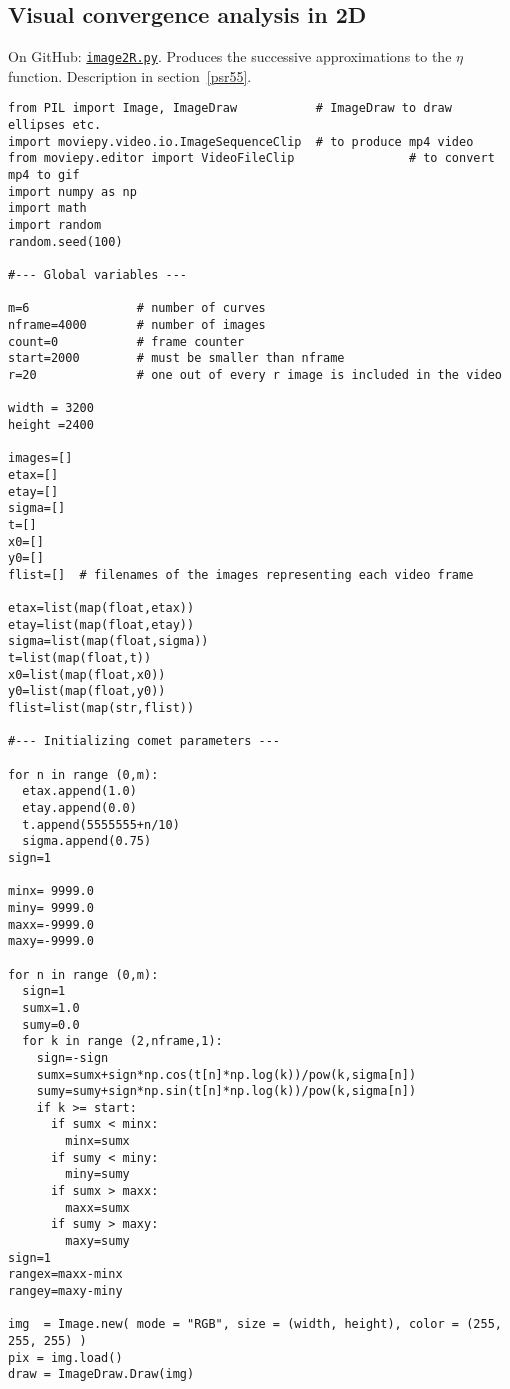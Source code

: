 \documentclass[oneside,10pt]{book}
\begin{document}
\subsection{Visual convergence analysis in 2D}\label{conv222}

On GitHub: \href{https://github.com/VincentGranville/Visualizations/blob/main/Source-Code/image2R.py}{\texttt{image2R.py}}. Produces the successive approximations to the $\eta$ function. Description in section~\ref{psr55}.

\begin{lstlisting}
from PIL import Image, ImageDraw           # ImageDraw to draw ellipses etc.
import moviepy.video.io.ImageSequenceClip  # to produce mp4 video
from moviepy.editor import VideoFileClip                # to convert mp4 to gif
import numpy as np
import math
import random
random.seed(100)

#--- Global variables ---

m=6               # number of curves
nframe=4000       # number of images
count=0           # frame counter
start=2000        # must be smaller than nframe
r=20              # one out of every r image is included in the video

width = 3200
height =2400

images=[]
etax=[]
etay=[]
sigma=[]
t=[]
x0=[]
y0=[]
flist=[]  # filenames of the images representing each video frame

etax=list(map(float,etax))
etay=list(map(float,etay))
sigma=list(map(float,sigma))
t=list(map(float,t))
x0=list(map(float,x0))
y0=list(map(float,y0))
flist=list(map(str,flist))

#--- Initializing comet parameters ---

for n in range (0,m):
  etax.append(1.0)
  etay.append(0.0)
  t.append(5555555+n/10)
  sigma.append(0.75)
sign=1

minx= 9999.0
miny= 9999.0
maxx=-9999.0
maxy=-9999.0

for n in range (0,m):
  sign=1
  sumx=1.0
  sumy=0.0
  for k in range (2,nframe,1):
    sign=-sign
    sumx=sumx+sign*np.cos(t[n]*np.log(k))/pow(k,sigma[n])
    sumy=sumy+sign*np.sin(t[n]*np.log(k))/pow(k,sigma[n])
    if k >= start:
      if sumx < minx:
        minx=sumx
      if sumy < miny:
        miny=sumy
      if sumx > maxx:
        maxx=sumx
      if sumy > maxy:
        maxy=sumy
sign=1
rangex=maxx-minx
rangey=maxy-miny

img  = Image.new( mode = "RGB", size = (width, height), color = (255, 255, 255) )
pix = img.load()
draw = ImageDraw.Draw(img)


\end{lstlisting}
\end{document}
